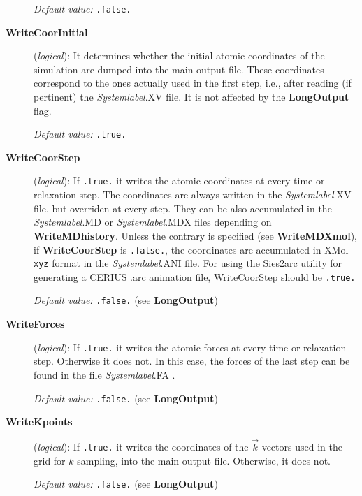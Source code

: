 \documentclass[11pt]{article}
\begin{document}
\begin{description}
{\it Default value:} {\tt .false.}


\item[{\bf WriteCoorInitial}] ({\it logical}):
It determines whether the initial atomic coordinates of the simulation are
dumped into the main output file. These coordinates correspond to the
ones actually used in the first step, i.e., after reading (if pertinent)
the {\it Systemlabel}.XV file. It is not affected by the {\bf LongOutput}
flag.

{\it Default value:} {\tt .true.}

 
\item[{\bf WriteCoorStep}] ({\it logical}):
If {\tt .true.} it writes the atomic coordinates at every 
time or relaxation step. The coordinates are
always written in the {\it Systemlabel}.XV file, but
overriden at every step. They can be also accumulated
in the {\it Systemlabel}.MD or {\it Systemlabel}.MDX files
depending on {\bf WriteMDhistory}. Unless the contrary is specified
(see {\bf WriteMDXmol}), if {\bf WriteCoorStep} is {\tt .false.}, 
the coordinates are accumulated in {\sc XMol} {\tt xyz} format in the
{\it Systemlabel}.ANI file.
For using the {\sc Sies2arc} utility
for generating a CERIUS .arc animation file,
WriteCoorStep should be {\tt .true.}

{\it Default value:} {\tt .false.} (see {\bf LongOutput})
 
 
\item[{\bf WriteForces}] ({\it logical}):
If {\tt .true.} it writes the atomic forces at every
time or relaxation step. Otherwise it does not. In this case,
the forces of the last step can be found in the file {\it Systemlabel}.FA .
 
{\it Default value:} {\tt .false.} (see {\bf LongOutput})

\item[{\bf WriteKpoints}] ({\it logical}):
If {\tt .true.} it writes the coordinates of the $\vec k$ vectors
used in the grid for $k$-sampling, into the main output file.
Otherwise, it does not.

{\it Default value:} {\tt .false.} (see {\bf LongOutput})


\end{description}
\end{document}
